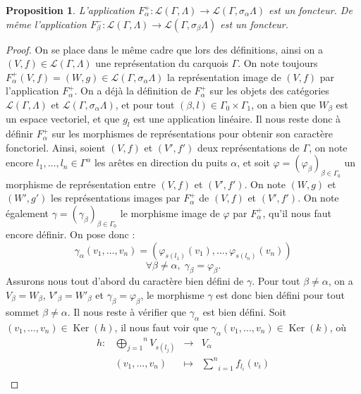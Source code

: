 \documentclass[a4paper,10pt]{article}
\newtheorem{prop}{Proposition}[section]
\DeclareMathOperator{\Ker}{Ker}
\begin{document}
\begin{prop}
	L'application $F_{\alpha}^{+}:\mathscr{L}(\Gamma,\Lambda)\rightarrow\mathscr{L}(\Gamma,\sigma_{\alpha}\Lambda)$ est un foncteur. De même l'application $F_{\beta}^{-}:\mathscr{L}(\Gamma,\Lambda)\rightarrow\mathscr{L}(\Gamma,\sigma_{\beta}\Lambda)$ est un foncteur.
\end{prop}

\begin{proof}
	On se place dans le même cadre que lors des définitions, ainsi on a $(V,f)\in\mathscr{L}(\Gamma,\Lambda)$ une représentation du carquois $\Gamma$. On note toujours $F_{\alpha}^{+}(V,f)=(W,g)\in\mathscr{L}(\Gamma,\sigma_{\alpha}\Lambda)$ la représentation image de $(V,f)$ par l'application $F_{\alpha}^{+}$. On a déjà la définition de $F_{\alpha}^{+}$ sur les objets des catégories $\mathscr{L}(\Gamma,\Lambda)$ et $\mathscr{L}(\Gamma,\sigma_{\alpha}\Lambda)$, et pour tout $(\beta,l)\in\Gamma_{0}\times\Gamma_{1}$, on a bien que $W_{\beta}$ est un espace vectoriel, et que $g_{l}$ est une application linéaire. Il nous reste donc à définir $F_{\alpha}^{+}$ sur les morphismes de représentations pour obtenir son caractère fonctoriel. Ainsi, soient $(V,f)$ et $(V',f')$ deux représentations de $\Gamma$, on note encore $l_{1},\dots,l_{n}\in\Gamma^{\alpha}$ les arêtes en direction du puits $\alpha$, et soit $\varphi=(\varphi_{\beta})_{\beta\in\Gamma_{0}}$ un morphisme de représentation entre $(V,f)$ et $(V',f')$. On note $(W,g)$ et $(W',g')$ les représentations images par $F_{\alpha}^{+}$ de $(V,f)$ et $(V',f')$. On note également $\gamma=(\gamma_{\beta})_{\beta\in\Gamma_{0}}$ le morphisme image de $\varphi$ par $F_{\alpha}^{+}$, qu'il nous faut encore définir. On pose donc :
	\[	
		\gamma_{\alpha}(v_{1},\dots,v_{n})=(\varphi_{s(l_{1})}(v_{1}),\dots,\varphi_{s(l_{n})}(v_{n}))
	\]
	\[
		\forall \beta\neq\alpha,\; \gamma_{\beta}=\varphi_{\beta}.
	\]
	Assurons nous tout d'abord du caractère bien défini de $\gamma$. Pour tout $\beta\neq\alpha$, on a $V_{\beta}=W_{\beta}$, $V'_{\beta}=W'_{\beta}$ et $\gamma_{\beta}=\varphi_{\beta}$, le morphisme $\gamma$ est donc bien défini pour tout sommet $\beta\neq\alpha$. Il nous reste à vérifier que $\gamma_{\alpha}$ est bien défini. Soit $(v_{1},\dots,v_{n})\in\Ker(h)$, il nous faut voir que $\gamma_{\alpha}(v_{1},\dots,v_{n})\in\Ker(k)$, où
	\[
\begin{array}{lccc}
	h : & \overset{n}{\underset{j=1}{\bigoplus}}V_{s(l_{j})}&\rightarrow & V_{\alpha} \\ 
	& (v_{1},\dots,v_{n})&\mapsto & \underset{i=1}{\overset{n}{\sum}}f_{l_{i}}(v_{i})\\

\end{array}\]
\end{proof}
\end{document}
